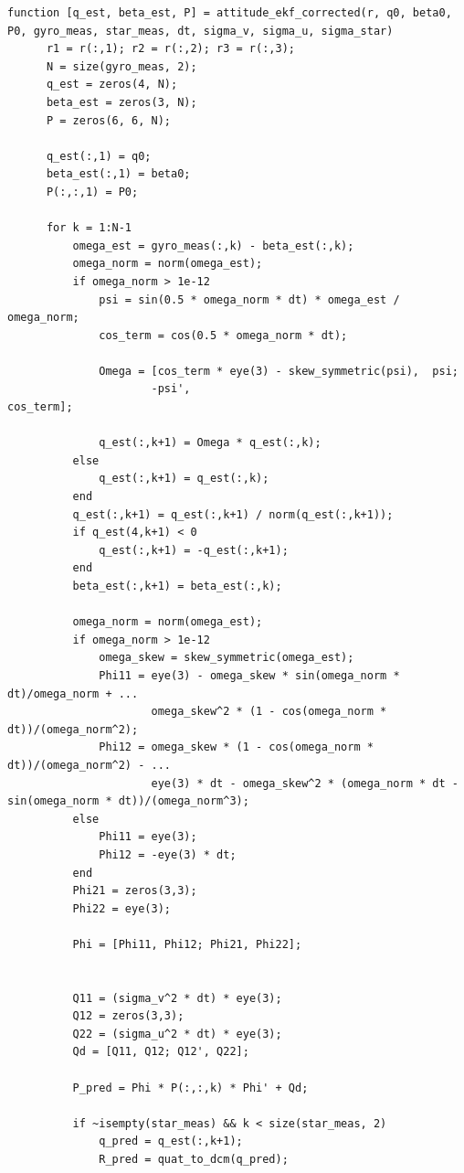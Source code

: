 \documentclass[12pt,A4, onecolumn]{exam}
\begin{document}
\begin{questions}
\begin{lstlisting}[style=matlabstyle]
  function [q_est, beta_est, P] = attitude_ekf_corrected(r, q0, beta0, P0, gyro_meas, star_meas, dt, sigma_v, sigma_u, sigma_star)
      r1 = r(:,1); r2 = r(:,2); r3 = r(:,3);
      N = size(gyro_meas, 2);
      q_est = zeros(4, N);
      beta_est = zeros(3, N);
      P = zeros(6, 6, N);
      
      q_est(:,1) = q0;
      beta_est(:,1) = beta0;
      P(:,:,1) = P0;
      
      for k = 1:N-1
          omega_est = gyro_meas(:,k) - beta_est(:,k);
          omega_norm = norm(omega_est);
          if omega_norm > 1e-12
              psi = sin(0.5 * omega_norm * dt) * omega_est / omega_norm;
              cos_term = cos(0.5 * omega_norm * dt);
              
              Omega = [cos_term * eye(3) - skew_symmetric(psi),  psi;
                      -psi',                                 cos_term];
              
              q_est(:,k+1) = Omega * q_est(:,k);
          else
              q_est(:,k+1) = q_est(:,k);
          end
          q_est(:,k+1) = q_est(:,k+1) / norm(q_est(:,k+1));
          if q_est(4,k+1) < 0
              q_est(:,k+1) = -q_est(:,k+1); 
          end
          beta_est(:,k+1) = beta_est(:,k);
          
          omega_norm = norm(omega_est);
          if omega_norm > 1e-12
              omega_skew = skew_symmetric(omega_est);
              Phi11 = eye(3) - omega_skew * sin(omega_norm * dt)/omega_norm + ...
                      omega_skew^2 * (1 - cos(omega_norm * dt))/(omega_norm^2);
              Phi12 = omega_skew * (1 - cos(omega_norm * dt))/(omega_norm^2) - ...
                      eye(3) * dt - omega_skew^2 * (omega_norm * dt - sin(omega_norm * dt))/(omega_norm^3);
          else
              Phi11 = eye(3);
              Phi12 = -eye(3) * dt;
          end
          Phi21 = zeros(3,3);
          Phi22 = eye(3);
          
          Phi = [Phi11, Phi12; Phi21, Phi22];
          
    
          Q11 = (sigma_v^2 * dt) * eye(3);
          Q12 = zeros(3,3);
          Q22 = (sigma_u^2 * dt) * eye(3);
          Qd = [Q11, Q12; Q12', Q22];
          
          P_pred = Phi * P(:,:,k) * Phi' + Qd;

          if ~isempty(star_meas) && k < size(star_meas, 2)
              q_pred = q_est(:,k+1);
              R_pred = quat_to_dcm(q_pred);
              

\end{lstlisting}
\end{questions}
\end{document}
